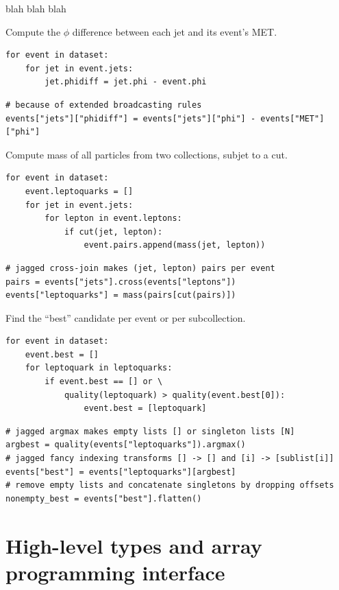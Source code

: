 \documentclass{webofc}
\begin{document}
blah blah blah

{\small

 Compute the $\phi$ difference between each jet and its event's MET.
\begin{verbatim}
for event in dataset:
    for jet in event.jets:
        jet.phidiff = jet.phi - event.phi
\end{verbatim}

\begin{verbatim}
# because of extended broadcasting rules
events["jets"]["phidiff"] = events["jets"]["phi"] - events["MET"]["phi"]
\end{verbatim}

 Compute mass of all particles from two collections, subjet to a cut.
\begin{verbatim}
for event in dataset:
    event.leptoquarks = []
    for jet in event.jets:
        for lepton in event.leptons:
            if cut(jet, lepton):
                event.pairs.append(mass(jet, lepton))
\end{verbatim}

\begin{verbatim}
# jagged cross-join makes (jet, lepton) pairs per event
pairs = events["jets"].cross(events["leptons"])
events["leptoquarks"] = mass(pairs[cut(pairs)])
\end{verbatim}

 Find the ``best'' candidate per event or per subcollection.
\begin{verbatim}
for event in dataset:
    event.best = []
    for leptoquark in leptoquarks:
        if event.best == [] or \
            quality(leptoquark) > quality(event.best[0]):
                event.best = [leptoquark]
\end{verbatim}

\begin{verbatim}
# jagged argmax makes empty lists [] or singleton lists [N]
argbest = quality(events["leptoquarks"]).argmax()
# jagged fancy indexing transforms [] -> [] and [i] -> [sublist[i]]
events["best"] = events["leptoquarks"][argbest]
# remove empty lists and concatenate singletons by dropping offsets
nonempty_best = events["best"].flatten()
\end{verbatim}

}

\section{High-level types and array programming interface}
\end{document}
